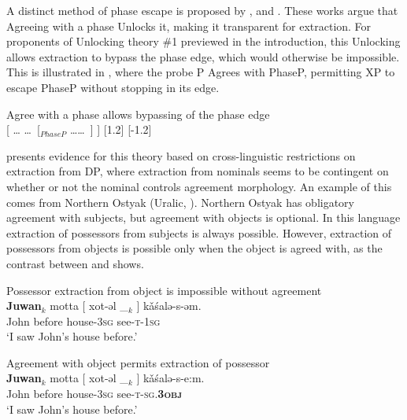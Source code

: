 \documentclass[output=paper,colorlinks,citecolor=brown]{langscibook}
\begin{document}
A distinct method of phase escape is proposed by \citet{RackowskiRichards2005, VanUrkRichards2015, Halpert2016, Halpert2019}, and \citet{Branan2018}. These works argue that Agreeing with a phase Unlocks it, making it transparent for extraction. For proponents of Unlocking theory \#1 previewed in the introduction, this Unlocking allows extraction to bypass the phase edge, which would otherwise be impossible. This is illustrated in , where the probe P Agrees with PhaseP, permitting XP to escape PhaseP without stopping in its edge.

\ea\label{ex:branan:2}
    Agree with a phase allows bypassing of the phase edge\\\baselineskip
{[}   \ldots {} \ldots \,  [$_{PhaseP}$   \ldots{}\ldots \,   ] ]
[1.2]
[-1.2]

\z

\citet{Branan2018} presents evidence for this theory based on cross-linguistic restrictions on extraction from DP, where extraction from nominals seems to be contingent on whether or not the nominal controls agreement morphology. An example of this comes from Northern Ostyak (Uralic, \citealt{Nikolaeva1999}). Northern Ostyak has obligatory agreement with subjects, but agreement with objects is optional. In this language extraction of possessors from subjects is always possible. However, extraction of possessors from objects is possible only when the object is agreed with, as the contrast between  and  shows.

\ea%
    \label{ex:branan:3}
    Possessor extraction from object is impossible without agreement\\
    \gll    *\textbf{Juwan}$_{k}$ motta [ xot-əl \_$_{k}$ ] k\v{a}\'{s}alə-s-əm.\\
            \hphantom{*}John before {} house-\textsc{3sg} {} {} see-\textsc{t-1sg} \\
    \glt    `I saw John's house before.'
\z

\ea 
    \label{ex:branan:4}
    Agreement with object permits extraction of possessor\\
    \gll    \textbf{Juwan}$_{k}$ motta [ xot-əl \_$_{k}$ ] k\v{a}\'{s}alə-s-e:m.  \\
            John before {} house-\textsc{3sg} {} {} see-\textsc{t-sg.\textbf{3obj}} \\
    \glt    `I saw John's house before.'
\z
\end{document}
